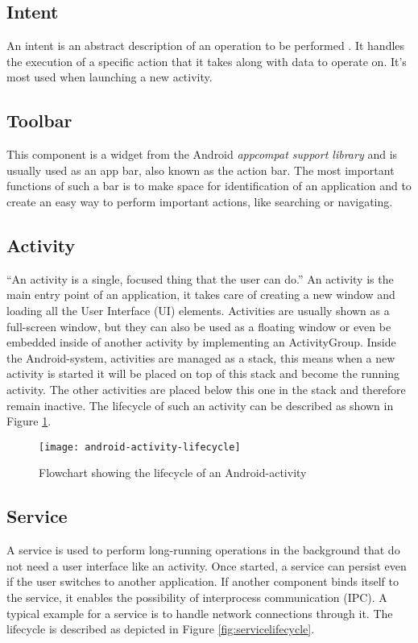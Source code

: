 \subsection{Intent}
An intent is an abstract description of an operation to be performed \cite{AndroidIntent}. It handles the execution of a specific action that it takes along with data to operate on. It's most used when launching a new activity.

\subsection{Toolbar}
This component is a widget from the Android \emph{appcompat support library} and is usually used as an app bar, also known as the action bar. The most important functions of such a bar is to make space for identification of an application and to create an easy way to perform important actions, like searching or navigating.

\subsection{Activity}
``An activity is a single, focused thing that the user can do.'' \cite{AndroidActivity} An activity is the main entry point of an application, it takes care of creating a new window and loading all the User Interface (UI) elements. Activities are usually shown as a full-screen window, but they can also be used as a floating window or even be embedded inside of another activity by implementing an ActivityGroup. Inside the Android-system, activities are managed as a stack, this means when a new activity is started it will be placed on top of this stack and become the running activity. The other activities are placed below this one in the stack and therefore remain inactive. The lifecycle of such an activity can be described as shown in Figure \ref{fig:activitylifecycle}.

\begin{figure}[H]
	\centering
	\texttt{[image: android-activity-lifecycle]}
	\caption{Flowchart showing the lifecycle of an Android-activity}
	\label{fig:activitylifecycle}
\end{figure}

\subsection{Service}
A service is used to perform long-running operations in the background that do not need a user interface like an activity. Once started, a service can persist even if the user switches to another application. If another component binds itself to the service, it enables the possibility of interprocess communication (IPC). A typical example for a service is to handle network connections through it. The lifecycle is described as depicted in Figure \ref{fig:servicelifecycle}.

